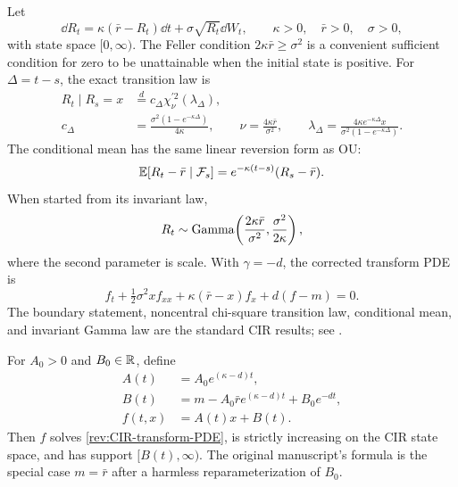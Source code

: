 Let
\begin{equation}
\dd R_t=\kappa(\bar r-R_t)\dd t+\sigma\sqrt{R_t}\dd W_t,
\qquad \kappa>0,\quad\bar r>0,\quad\sigma>0,
\label{rev:CIR}
\end{equation}
with state space $[0,\infty)$.  The Feller condition
$2\kappa\bar r\ge\sigma^2$ is a convenient sufficient condition for zero to be
unattainable when the initial state is positive.  For $\Delta=t-s$, the exact
transition law is
\begin{align}
R_t\mid R_s=x&\overset d=c_\Delta
\chi^{\prime 2}_{\nu}(\lambda_\Delta),\label{rev:CIR-transition}\\
c_\Delta&=\frac{\sigma^2(1-e^{-\kappa\Delta})}{4\kappa},
\qquad
\nu=\frac{4\kappa\bar r}{\sigma^2},
\qquad
\lambda_\Delta=
\frac{4\kappa e^{-\kappa\Delta}x}
{\sigma^2(1-e^{-\kappa\Delta})}.
\end{align}
The conditional mean has the same linear reversion form as OU:
\begin{equation}
\mathbb E[R_t-\bar r\mid\mathcal F_s]
=e^{-\kappa(t-s)}(R_s-\bar r).
\label{rev:CIR-conditional-mean}
\end{equation}
When started from its invariant law,
\begin{equation}
R_t\sim\operatorname{Gamma}\!\left(\frac{2\kappa\bar r}{\sigma^2},
                    \frac{\sigma^2}{2\kappa}\right),
\label{rev:CIR-stationary}
\end{equation}
where the second parameter is scale.  With $\gamma=-d$, the corrected
transform PDE is
\begin{equation}
f_t+\tfrac12\sigma^2x f_{xx}
+\kappa(\bar r-x)f_x+d(f-m)=0.
\label{rev:CIR-transform-PDE}
\end{equation}
The boundary statement, noncentral chi-square transition law, conditional mean,
and invariant Gamma law are the standard CIR results; see
\citet{CoxIngersollRoss1985}.

\begin{example}
\label{rev:ex-affine-CIR}
For $A_0>0$ and $B_0\in\mathbb R$, define
\begin{align}
A(t)&=A_0e^{(\kappa-d)t},\label{rev:affine-CIR-A}\\
B(t)&=m-A_0\bar r e^{(\kappa-d)t}+B_0e^{-dt},
\label{rev:affine-CIR-B}\\
f(t,x)&=A(t)x+B(t).
\label{rev:affine-CIR-transform}
\end{align}
Then $f$ solves \eqref{rev:CIR-transform-PDE}, is strictly increasing on the
CIR state space, and has support $[B(t),\infty)$.  The original manuscript's
formula is the special case $m=\bar r$ after a harmless reparameterization of
$B_0$.
\end{example}


